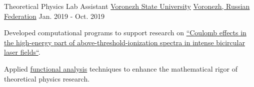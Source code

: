 \begin{cventries}
	\cventry
	{Theoretical Physics Lab Assistant}
	{\href{https://www.linkedin.com/school/\%D0\%B2\%D0\%BE\%D1\%80\%D0\%BE\%D0\%BD\%D0\%B5\%D0\%B6\%D1\%81\%D0\%BA\%D0\%B8\%D0\%B9-\%D0\%B3\%D0\%BE\%D1\%81\%D1\%83\%D0\%B4\%D0\%B0\%D1\%80\%D1\%81\%D1\%82\%D0\%B2\%D0\%B5\%D0\%BD\%D0\%BD\%D1\%8B\%D0\%B9-\%D1\%83\%D0\%BD\%D0\%B8\%D0\%B2\%D0\%B5\%D1\%80\%D1\%81\%D0\%B8\%D1\%82\%D0\%B5\%D1\%82}{Voronezh State University}}
	{\href{https://www.google.com/maps/place/Voronezh,+Voronezh+Oblast,+Russia}{Voronezh, Russian Federation}}
	{Jan. 2019 - Oct. 2019}
	{
		\begin{cvitems}
			\item {Developed computational programs to support research on \href{https://journals.aps.org/pra/abstract/10.1103/PhysRevA.106.033117}{``Coulomb effects in the high-energy part of above-threshold-ionization spectra in intense bicircular laser fields``}.}
			\item {Applied \href{https://en.wikipedia.org/wiki/Functional_analysis}{functional analysis} techniques to enhance the mathematical rigor of theoretical physics research.}
		\end{cvitems}
	}

\end{cventries}

